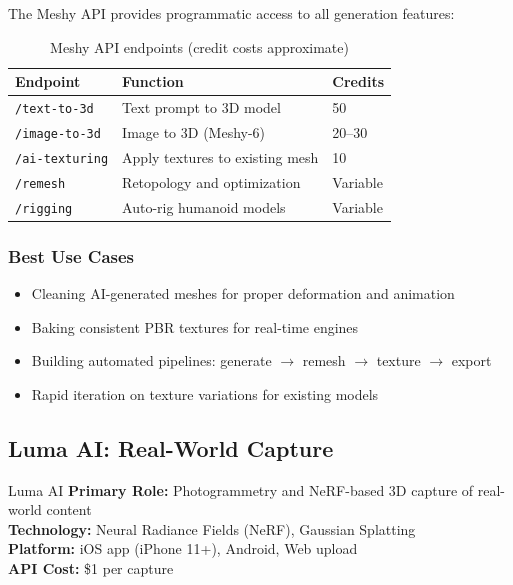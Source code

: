 \documentclass[11pt]{article}
\newcommand{\apiendpoint}[1]{\texttt{\small #1}}
\begin{document}
The Meshy API provides programmatic access to all generation features:

\begin{table}[H]
\centering
\small
\begin{tabular}{@{}l l l@{}}
\toprule
\textbf{Endpoint} & \textbf{Function} & \textbf{Credits} \\
\midrule
\apiendpoint{/text-to-3d} & Text prompt to 3D model & 50 \\
\apiendpoint{/image-to-3d} & Image to 3D (Meshy-6) & 20--30 \\
\apiendpoint{/ai-texturing} & Apply textures to existing mesh & 10 \\
\apiendpoint{/remesh} & Retopology and optimization & Variable \\
\apiendpoint{/rigging} & Auto-rig humanoid models & Variable \\
\bottomrule
\end{tabular}
\caption{Meshy API endpoints (credit costs approximate)}
\label{tab:meshy-api}
\end{table}

\subsubsection{Best Use Cases}

\begin{itemize}[leftmargin=2em]
  \item Cleaning AI-generated meshes for proper deformation and animation
  \item Baking consistent PBR textures for real-time engines
  \item Building automated pipelines: generate $\rightarrow$ remesh $\rightarrow$ texture $\rightarrow$ export
  \item Rapid iteration on texture variations for existing models
\end{itemize}

\subsection{Luma AI: Real-World Capture}

\begin{toolbox}{Luma AI}
\textbf{Primary Role:} Photogrammetry and NeRF-based 3D capture of real-world content\\
\textbf{Technology:} Neural Radiance Fields (NeRF), Gaussian Splatting\\
\textbf{Platform:} iOS app (iPhone 11+), Android, Web upload\\
\textbf{API Cost:} \$1 per capture
\end{toolbox}
\end{document}
